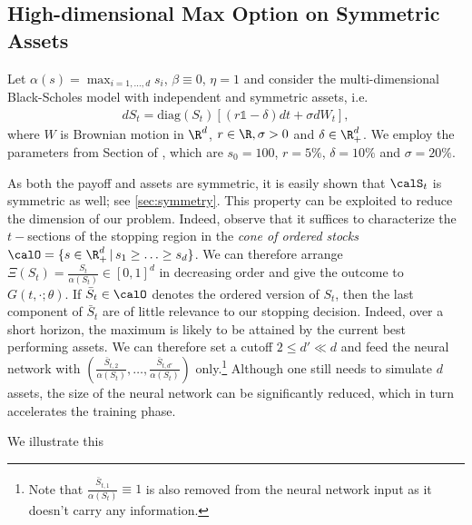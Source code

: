 \subsection{High-dimensional Max Option on Symmetric Assets}\label{sec:maxCallSym}
Let $\alpha(s) = \max_{i=1,...,d}s_i$, $\beta\equiv 0$, $\eta=1$ and consider the multi-dimensional Black-Scholes model with independent and symmetric assets, i.e. 
\begin{align}\label{eq:BSAsym}
    d S_t = \text{diag}(S_t) \left[ (r\mathds{1} - \delta)dt + \sigma dW_t\right],
\end{align}
where $W$ is Brownian motion in $\R^d$, $r \in \R ,\sigma > 0$ and $\delta \in \R_+^d$. We employ the parameters from Section of \cite{Becker2}, which are $s_0 =100 $, $r=5\%$, $\delta =10\%$ and $\sigma = 20 \%$. 

As both the payoff and assets are symmetric, it is easily shown that  $\calS_t$ is symmetric as well; see \cref{sec:symmetry}. This property can be exploited to reduce the dimension of our problem. Indeed, observe that it suffices to characterize the $t-$sections of the stopping region in the \textit{cone of ordered stocks}  
 $\calO = \{s\in \R_+^d \,|\, s_1 \geq \ldots \geq s_d\}$. We can therefore arrange $\Xi(S_t) = \frac{S_t}{\alpha(S_t)}\in [0,1]^d$ in decreasing order and give the outcome to $G(t,\cdot; \theta)$. If $\bar{S}_t \in \calO$ denotes the ordered version of $S_t$, then the last component of $\bar{S}_t$ are of little relevance to our stopping decision. 
 Indeed, over a short horizon, the maximum is  likely to be attained by the current best performing assets. %
 We can therefore set a cutoff $2 \le d' \ll d$ and feed the neural network with $(\frac{\bar{S}_{t,2}}{\alpha(S_t)},\ldots,\frac{\bar{S}_{t,d'}}{\alpha(S_t)})$ only.\footnote{Note that $\frac{\bar{S}_{t,1}}{\alpha(S_t)} \equiv 1$ is also removed from the neural network input as it doesn't carry any information.} Although one still needs to simulate $d$ assets, the size of the neural network can be significantly reduced, which in turn accelerates the training phase.  
 
 We illustrate this %
 

